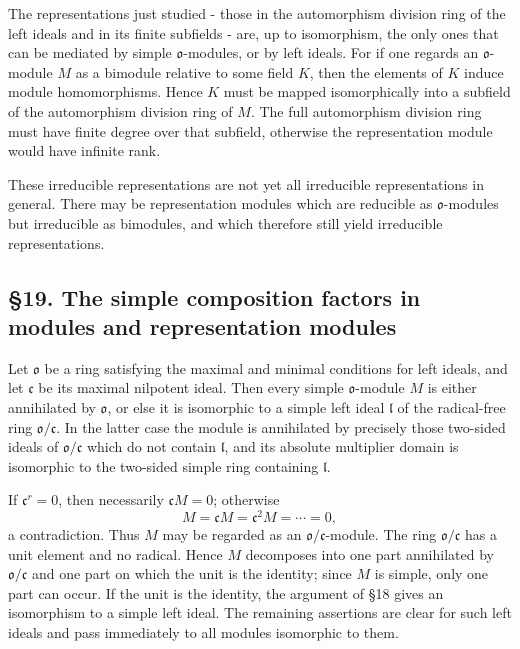 \documentclass[11pt]{article}
\begin{document}
The representations just studied - those in the automorphism division
ring of the left ideals and in its finite subfields - are, up to
isomorphism, the only ones that can be mediated by simple
\(\mathfrak{o}\)-modules, or by left ideals. For if one regards an
\(\mathfrak{o}\)-module \(M\) as a bimodule relative to some field
\(K\), then the elements of \(K\) induce module homomorphisms. Hence
\(K\) must be mapped isomorphically into a subfield of the automorphism
division ring of \(M\). The full automorphism division ring must have
finite degree over that subfield, otherwise the representation module
would have infinite rank.

These irreducible representations are not yet all irreducible
representations in general. There may be representation modules which
are reducible as \(\mathfrak{o}\)-modules but irreducible as bimodules,
and which therefore still yield irreducible representations.

\subsection{§19. The simple composition factors in modules and
representation
modules}\label{the-simple-composition-factors-in-modules-and-representation-modules}

Let \(\mathfrak{o}\) be a ring satisfying the maximal and minimal
conditions for left ideals, and let \(\mathfrak c\) be its maximal
nilpotent ideal. Then every simple \(\mathfrak{o}\)-module \(M\) is
either annihilated by \(\mathfrak{o}\), or else it is isomorphic to a
simple left ideal \(\mathfrak l\) of the radical-free ring
\(\mathfrak{o}/\mathfrak c\). In the latter case the module is
annihilated by precisely those two-sided ideals of
\(\mathfrak{o}/\mathfrak c\) which do not contain \(\mathfrak l\), and
its absolute multiplier domain is isomorphic to the two-sided simple
ring containing \(\mathfrak l\).

If \(\mathfrak c^r=0\), then necessarily \(\mathfrak cM=0\); otherwise
\[
  M=\mathfrak cM=\mathfrak c^2M=\cdots=0,
\] a contradiction. Thus \(M\) may be regarded as an
\(\mathfrak{o}/\mathfrak c\)-module. The ring
\(\mathfrak{o}/\mathfrak c\) has a unit element and no radical. Hence
\(M\) decomposes into one part annihilated by
\(\mathfrak{o}/\mathfrak c\) and one part on which the unit is the
identity; since \(M\) is simple, only one part can occur. If the unit is
the identity, the argument of §18 gives an isomorphism to a simple left
ideal. The remaining assertions are clear for such left ideals and pass
immediately to all modules isomorphic to them.
\end{document}
